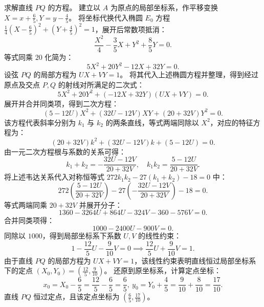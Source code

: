 \begin{solution}
求解直线 $PQ$ 的方程。
建立以 $A$ 为原点的局部坐标系，作平移变换 $X = x + \frac{6}{5}, Y = y - \frac{4}{5}$。
将坐标代换代入椭圆 $E_0$ 方程 $\frac{1}{4}\left(X - \frac{6}{5}\right)^2 + \left(Y + \frac{4}{5}\right)^2 = 1$，展开后常数项抵消：
\[ \frac{X^2}{4} - \frac{3}{5}X + Y^2 + \frac{8}{5}Y = 0. \]
等式同乘 $20$ 化简为：
\[ 5X^2 + 20Y^2 - 12X + 32Y = 0. \]
设弦 $PQ$ 的局部方程为 $UX + VY = 1$。
将其代入上述椭圆方程并整理，得到经过原点及交点 $P, Q$ 的射线对所满足的二次式：
\[ 5X^2 + 20Y^2 + (-12X + 32Y)(UX + VY) = 0. \]
展开并合并同类项，得到二次方程：
\[ (5 - 12U)X^2 + (32U - 12V)XY + (20 + 32V)Y^2 = 0. \]
该方程代表斜率分别为 $k_1$ 与 $k_2$ 的两条直线，等式两端同除以 $X^2$，对应的特征方程为：
\[ (20 + 32V)k^2 + (32U - 12V)k + (5 - 12U) = 0. \]
由一元二次方程根与系数的关系可得：
\[ k_1 + k_2 = -\frac{32U - 12V}{20 + 32V}, \quad k_1 k_2 = \frac{5 - 12U}{20 + 32V}. \]
将上述韦达关系代入对称恒等式 $272k_1 k_2 - 27(k_1 + k_2) - 18 = 0$ 中：
\[ 272 \left( \frac{5 - 12U}{20 + 32V} \right) - 27 \left( -\frac{32U - 12V}{20 + 32V} \right) - 18 = 0. \]
等式两端同乘 $20 + 32V$ 并展开分子：
\[ 1360 - 3264U + 864U - 324V - 360 - 576V = 0. \]
合并同类项得：
\[ 1000 - 2400U - 900V = 0. \]
同除以 $1000$，得到局部坐标系下系数 $U, V$ 的线性约束：
\[ 1 - \frac{12}{5}U - \frac{9}{10}V = 0 \implies \frac{12}{5}U + \frac{9}{10}V = 1. \]
由于直线 $PQ$ 的局部方程为 $UX + VY = 1$，该线性约束表明直线恒过局部坐标系下的定点 $(X_0, Y_0) = \left(\frac{12}{5}, \frac{9}{10}\right)$。
还原到原坐标系，计算定点坐标：
\[ x_0 = X_0 - \frac{6}{5} = \frac{12}{5} - \frac{6}{5} = \frac{6}{5},~ y_0 = Y_0 + \frac{4}{5} = \frac{9}{10} + \frac{8}{10} = \frac{17}{10}. \]
直线 $PQ$ 恒过定点，且该定点坐标为 $\left(\frac{6}{5}, \frac{17}{10}\right)$。
\end{solution}



